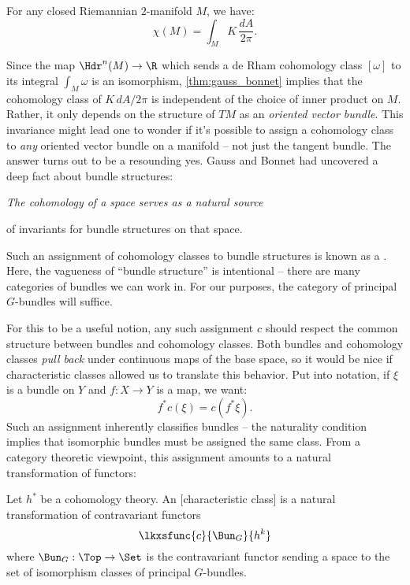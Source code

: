 \begin{theorem}\label{thm:gauss_bonnet} For any closed Riemannian $2$-manifold $M$, we have:\[\chi(M) = \int_M K\, \frac{dA}{2\pi}.\]
\end{theorem}

Since the map $\Hdr^n(M) \to \R$ which sends a de Rham cohomology class $[\omega]$ to its integral $\int_M \omega$ is an isomorphism, \cref{thm:gauss_bonnet} implies that the cohomology class of $K\,dA/2\pi$ is independent of the choice of inner product on $M$. Rather, it only depends on the structure of $TM$ as an \emph{oriented vector bundle}.
This invariance might lead one to wonder if it's possible to assign a cohomology class to \emph{any} oriented vector bundle on a manifold -- not just the tangent bundle. The answer turns out to be a resounding yes. Gauss and Bonnet had uncovered a deep fact about bundle structures:
\begin{center}
	\slshape
The cohomology of a space serves as a natural source 

of invariants for bundle structures on that space. 
\end{center}
Such an assignment of cohomology classes to bundle structures is known as a . 
Here, the vagueness of ``bundle structure'' is intentional -- there are many categories of bundles we can work in. For our purposes, the category of principal $G$-bundles will suffice.

For this to be a useful notion, any such assignment $c$ should respect the common structure between bundles and cohomology classes. Both bundles and cohomology classes \emph{pull back} under continuous maps of the base space, so it would be nice if characteristic classes allowed us to translate this behavior.
Put into notation, if $\xi$ is a bundle on $Y$ and $f : X \to Y$ is a map, we want:
\[
  f^* c(\xi) = c(f^*\xi).
\]
Such an assignment inherently classifies bundles -- the naturality condition implies that isomorphic bundles must be assigned the same class. From a category theoretic viewpoint, this assignment amounts to a natural transformation of functors:
\begin{definition}
  Let $h^*$ be a cohomology theory. An [characteristic class] is a natural transformation of contravariant functors
  \[
  	\lkxsfunc{c}{\Bun_G}{h^k}
  \]
  where $\Bun_G : \Top \to \Set$ is the contravariant functor sending a space to the set of isomorphism classes of principal $G$-bundles.
\end{definition}

